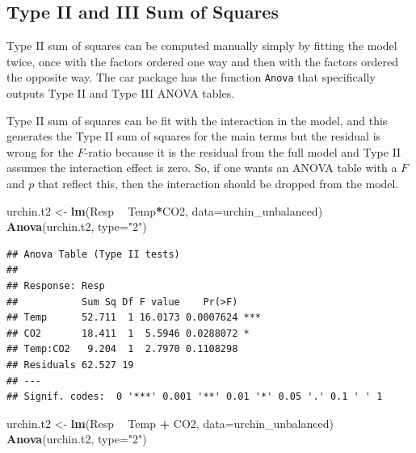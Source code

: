 \documentclass[]{book}
\newenvironment{Shaded}{\begin{snugshade}}{\end{snugshade}}
\newcommand{\KeywordTok}[1]{\textcolor[rgb]{0.13,0.29,0.53}{\textbf{#1}}}
\newcommand{\DataTypeTok}[1]{\textcolor[rgb]{0.13,0.29,0.53}{#1}}
\newcommand{\StringTok}[1]{\textcolor[rgb]{0.31,0.60,0.02}{#1}}
\newcommand{\OperatorTok}[1]{\textcolor[rgb]{0.81,0.36,0.00}{\textbf{#1}}}
\newcommand{\NormalTok}[1]{#1}
\begin{document}
\subsection{Type II and III Sum of
Squares}\label{type-ii-and-iii-sum-of-squares}

Type II sum of squares can be computed manually simply by fitting the
model twice, once with the factors ordered one way and then with the
factors ordered the opposite way. The car package has the function
\texttt{Anova} that specifically outputs Type II and Type III ANOVA
tables.

Type II sum of squares can be fit with the interaction in the model, and
this generates the Type II sum of squares for the main terms but the
residual is wrong for the \(F\)-ratio because it is the residual from
the full model and Type II assumes the interaction effect is zero. So,
if one wants an ANOVA table with a \(F\) and \(p\) that reflect this,
then the interaction should be dropped from the model.

\begin{Shaded}
\begin{Highlighting}[]
\NormalTok{urchin.t2 <-}\StringTok{ }\KeywordTok{lm}\NormalTok{(Resp }\OperatorTok{~}\StringTok{ }\NormalTok{Temp}\OperatorTok{*}\NormalTok{CO2, }\DataTypeTok{data=}\NormalTok{urchin_unbalanced)}
\KeywordTok{Anova}\NormalTok{(urchin.t2, }\DataTypeTok{type=}\StringTok{"2"}\NormalTok{)}
\end{Highlighting}
\end{Shaded}

\begin{verbatim}
## Anova Table (Type II tests)
## 
## Response: Resp
##           Sum Sq Df F value    Pr(>F)    
## Temp      52.711  1 16.0173 0.0007624 ***
## CO2       18.411  1  5.5946 0.0288072 *  
## Temp:CO2   9.204  1  2.7970 0.1108298    
## Residuals 62.527 19                      
## ---
## Signif. codes:  0 '***' 0.001 '**' 0.01 '*' 0.05 '.' 0.1 ' ' 1
\end{verbatim}

\begin{Shaded}
\begin{Highlighting}[]
\NormalTok{urchin.t2 <-}\StringTok{ }\KeywordTok{lm}\NormalTok{(Resp }\OperatorTok{~}\StringTok{ }\NormalTok{Temp }\OperatorTok{+}\StringTok{ }\NormalTok{CO2, }\DataTypeTok{data=}\NormalTok{urchin_unbalanced)}
\KeywordTok{Anova}\NormalTok{(urchin.t2, }\DataTypeTok{type=}\StringTok{"2"}\NormalTok{)}
\end{Highlighting}
\end{Shaded}
\end{document}
